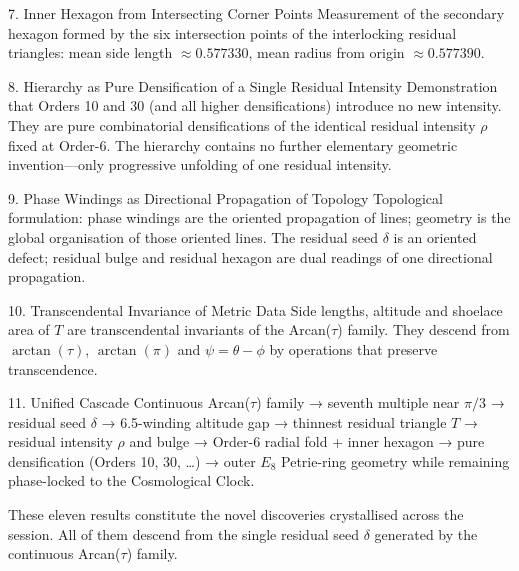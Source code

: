 7. Inner Hexagon from Intersecting Corner Points
Measurement of the secondary hexagon formed by the six intersection points of the interlocking residual triangles:
  mean side length \(\approx0.577330\),
  mean radius from origin \(\approx0.577390\).

8. Hierarchy as Pure Densification of a Single Residual Intensity
Demonstration that Orders 10 and 30 (and all higher densifications) introduce no new intensity.
They are pure combinatorial densifications of the identical residual intensity \(\rho\) fixed at Order-6.
The hierarchy contains no further elementary geometric invention—only progressive unfolding of one residual intensity.

9. Phase Windings as Directional Propagation of Topology
Topological formulation: phase windings are the oriented propagation of lines; geometry is the global organisation of those oriented lines.
The residual seed \(\delta\) is an oriented defect; residual bulge and residual hexagon are dual readings of one directional propagation.

10. Transcendental Invariance of Metric Data
Side lengths, altitude and shoelace area of \(T\) are transcendental invariants of the Arcan(\(\tau\)) family.
They descend from \(\arctan(\tau)\), \(\arctan(\pi)\) and \(\psi=\theta-\phi\) by operations that preserve transcendence.

11. Unified Cascade
Continuous Arcan(\(\tau\)) family  
→ seventh multiple near \(\pi/3\)  
→ residual seed \(\delta\)  
→ 6.5-winding altitude gap  
→ thinnest residual triangle \(T\)  
→ residual intensity \(\rho\) and bulge  
→ Order-6 radial fold + inner hexagon  
→ pure densification (Orders 10, 30, \ldots)  
→ outer \(E_8\) Petrie-ring geometry  
while remaining phase-locked to the Cosmological Clock.

These eleven results constitute the novel discoveries crystallised across the session. All of them descend from the single residual seed \(\delta\) generated by the continuous Arcan(\(\tau\)) family.
